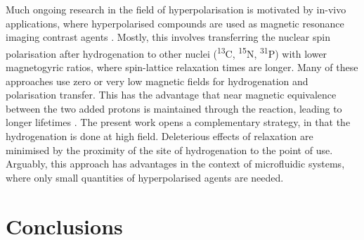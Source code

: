 Much ongoing research in the field of hyperpolarisation is
motivated by in-vivo applications, where hyperpolarised compounds
are used as magnetic
resonance imaging contrast agents \cite{Hovener:2018cg}.
Mostly, this involves transferring the
nuclear spin polarisation after hydrogenation to other nuclei
(\textsuperscript{13}C, \textsuperscript{15}N, \textsuperscript{31}P) with
lower magnetogyric ratios, where spin-lattice relaxation times are longer.
\cite{Goldman:2005bf,Goldman:2006cp,Reineri:2015he} Many of these approaches
use zero or very low magnetic fields for hydrogenation and polarisation
transfer. This has the advantage that near magnetic equivalence between the two
added protons is maintained through the reaction, leading to longer lifetimes
\cite{bhattacharya2007towards,chekmenev2008pasadena,
chekmenev2009hyperpolarized,shchepin2014parahydrogen,
Reineri:2015he,cavallari201813,ripka2018hyperpolarized,roy2018sabre}.
The present work opens a complementary strategy, in that the hydrogenation
is done at high field. Deleterious effects of relaxation are minimised by
the proximity of the site of hydrogenation to the point of use. Arguably,
this approach has advantages in the context of microfluidic systems, where
only small quantities of hyperpolarised agents are needed.

\section{Conclusions}

